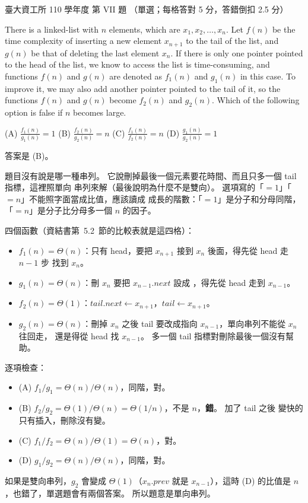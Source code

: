 \begin{pastexam}[label={px:ntu-110-dsaa-07}]{臺大資工所 110 學年度 第 VII 題}
（單選；每格答對 5 分，答錯倒扣 2.5 分）

There is a linked-list with $n$ elements, which are $x_1,x_2,\ldots,x_n$. Let $f(n)$ be the time
complexity of inserting a new element $x_{n+1}$ to the tail of the list, and $g(n)$ be that of
deleting the last element $x_n$. If there is only one pointer pointed to the head of the list,
we know to access the list is time-consuming, and functions $f(n)$ and $g(n)$ are denoted as
$f_1(n)$ and $g_1(n)$ in this case. To improve it, we may also add another pointer pointed to
the tail of it, so the functions $f(n)$ and $g(n)$ become $f_2(n)$ and $g_2(n)$. Which of the
following option is false if $n$ becomes large. \underline{}

(A) $\frac{f_1(n)}{g_1(n)}=1$ \qquad (B) $\frac{f_2(n)}{g_2(n)}=n$ \qquad
(C) $\frac{f_1(n)}{f_2(n)}=n$ \qquad (D) $\frac{g_1(n)}{g_2(n)}=1$
\end{pastexam}

\begin{pastsoln}
答案是 (B)。

題目沒有說是哪一種串列。 它說刪掉最後一個元素要花時間、而且只多一個 tail 指標，這裡照單向
串列來解（最後說明為什麼不是雙向）。 選項寫的「$= 1$」「$= n$」不能照字面當成比值，應該讀成
成長的階數：「$= 1$」是分子和分母同階，「$= n$」是分子比分母多一個 $n$ 的因子。

四個函數（資結書第~5.2~節的比較表就是這四格）：
\begin{itemize}
\item $f_1(n) = \Theta(n)$：只有 head，要把 $x_{n+1}$ 接到 $x_n$ 後面，得先從 head 走 $n - 1$ 步
找到 $x_n$。
\item $g_1(n) = \Theta(n)$：刪 $x_n$ 要把 $x_{n-1}.\mathit{next}$ 設成 \NIL，得先從 head 走到
$x_{n-1}$。
\item $f_2(n) = \Theta(1)$：$\mathit{tail}.\mathit{next} \gets x_{n+1}$，$\mathit{tail} \gets x_{n+1}$。
\item $g_2(n) = \Theta(n)$：刪掉 $x_n$ 之後 tail 要改成指向 $x_{n-1}$，單向串列不能從 $x_n$ 往回走，
還是得從 head 找 $x_{n-1}$。 多一個 tail 指標對刪除最後一個沒有幫助。
\end{itemize}

逐項檢查：
\begin{itemize}
\item (A) $f_1 / g_1 = \Theta(n) / \Theta(n)$，同階，對。
\item (B) $f_2 / g_2 = \Theta(1) / \Theta(n) = \Theta(1/n)$，不是 $n$，\textbf{錯}。 加了 tail 之後
變快的只有插入，刪除沒有變。
\item (C) $f_1 / f_2 = \Theta(n) / \Theta(1) = \Theta(n)$，對。
\item (D) $g_1 / g_2 = \Theta(n) / \Theta(n)$，同階，對。
\end{itemize}

如果是雙向串列，$g_2$ 會變成 $\Theta(1)$（$x_n.\mathit{prev}$ 就是 $x_{n-1}$），這時 (D) 的比值是
$n$，也錯了，單選題會有兩個答案。 所以題意是單向串列。
\end{pastsoln}
